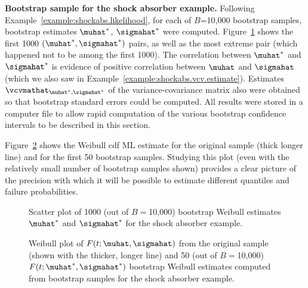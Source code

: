 \begin{example}
\label{example:shock.abs.bs.sample}
{\bf Bootstrap sample for the shock absorber example.} 
Following Example~\ref{example:shockabs.likelihood}, for each of
$B$=10,000 bootstrap samples, bootstrap estimates $\muhat^{*}$,
$\sigmahat^{*}$ were computed.
Figure~\ref{figure:shockabsB.weib.boot.mu.vs.sigma.ps} shows the first
1000 $(\muhat^{*},\sigmahat^{*})$ pairs, as well as the most extreme
pair (which happened not to be among the first 1000). The correlation
between $\muhat^{*}$ and $\sigmahat^{*}$
is evidence of positive correlation between $\muhat$ and
$\sigmahat$ (which we also saw in Example~\ref{example:shockabs.vcv.estimate}). 
Estimates $\vcvmathat_{\muhat^{*},\sigmahat^{*}}$ of the
variance-covariance matrix also were obtained so that bootstrap standard
errors could be computed. All results were stored in a computer file
to allow rapid computation of the various bootstrap confidence intervals to
be described in this section.

Figure~\ref{figure:shockabsB.weib.boot.mleprobplot.ps} shows the
Weibull cdf ML estimate for the original sample (thick longer line) and for
the first 50 bootstrap samples.  Studying this plot (even with
the relatively small number of bootstrap samples shown) provides a
clear picture of the precision with which it will be possible to
estimate different quantiles and failure probabilities.
\begin{figure}
\caption{Scatter plot of 1000 (out of $B=$10,000) bootstrap Weibull
estimates $\muhat^{*}$ and $\sigmahat^{*}$ for the shock absorber example.}
\label{figure:shockabsB.weib.boot.mu.vs.sigma.ps}
\end{figure}
\begin{figure}
\caption{Weibull plot of 
$F(t;\muhat,\sigmahat)$ from the original sample 
(shown with the thicker, longer line)
and 50 (out of $B=$10,000) $F(t;\muhat^{*},\sigmahat^{*})$ bootstrap
Weibull estimates computed from bootstrap samples for the shock
absorber example.}
\label{figure:shockabsB.weib.boot.mleprobplot.ps}
\end{figure}
\end{example}

